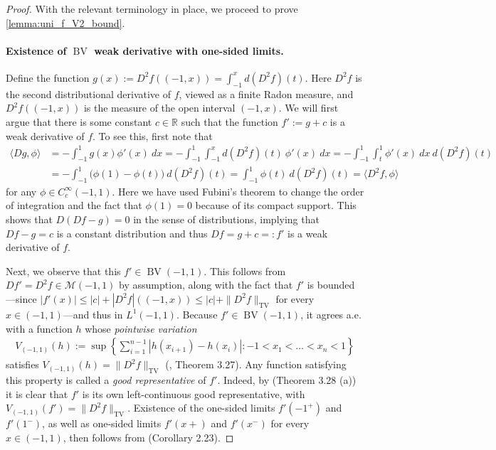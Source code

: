 \documentclass{article}
\DeclareMathOperator{\TV}{TV}
\DeclareMathOperator{\BV}{BV}
\def\cM{{\mathcal{M}}}
\newcommand{\R}{\mathbb{R}}
\begin{document}
\begin{appendices}
\begin{proof}
    With the relevant terminology in place, we proceed to prove \cref{lemma:uni_f_V2_bound}.
    \paragraph{Existence of $\BV$ weak derivative with one-sided limits.} Define the function $g(x) := D^2 f((-1,x))= \int_{-1}^x  d(D^2 f)(t)$. Here $D^2 f$ is the second distributional derivative of $f$, viewed as a finite Radon measure, and $D^2 f((-1,x))$ is the measure of the open interval $(-1,x)$. We will first argue that there is some constant $c \in \R$ such that the function $f' := g+c$ is a weak derivative of $f$. To see this, first note that 
    \begin{align}
        \langle Dg, \phi \rangle &= -\int_{-1}^1 g(x) \phi'(x) \ dx = -\int_{-1}^1 \int_{-1}^x  d(D^2 f)(t) \  \phi'(x) \ dx = - \int_{-1}^1 \int_{t}^1  \phi'(x)  \ dx \ d(D^2 f)(t) \\
        &= - \int_{-1}^1 \big(\phi(1) - \phi(t)\big) \ d (D^2 f)(t) = \int_{-1}^1 \phi(t) \ d(D^2 f)(t) = \langle D^2 f, \phi \rangle
    \end{align}
    for any $\phi \in C_c^\infty(-1,1)$. Here we have used Fubini's theorem to change the order of integration and the fact that $\phi(1)=0$ because of its compact support. This shows that $D(Df - g) = 0$ in the sense of distributions, implying that $Df-g = c$ is a constant distribution and thus $Df = g+c =: f'$ is a weak derivative of $f$.

    Next, we observe that this $f' \in \BV(-1,1)$. This follows from $Df' = D^2 f \in \cM(-1,1)$ by assumption, along with the fact that $f'$ is bounded---since $|f'(x)| \leq |c| + |D^2 f|((-1,x)) \leq |c| + \| D^2 f \|_{\TV}$ for every $x \in (-1,1)$---and thus in $L^1(-1,1)$. Because $f' \in \BV(-1,1)$, it agrees a.e. with a function $h$ whose \textit{pointwise variation}
    \begin{align} \label{eq:pointwise_variation}
        V_{(-1,1)} (h) := \sup \left\{ \sum_{i=1}^{n-1} |h(x_{i+1}) - h(x_i)|: -1 < x_1 < \dots < x_n < 1 \right\}
    \end{align}
    satisfies $V_{(-1,1)} (h) = \| D^2 f \|_{\TV}$ (\cite{ambrosio2000functions}, Theorem 3.27). Any function satisfying this property is called a \textit{good representative} of $f'$. Indeed, by \cite{ambrosio2000functions} (Theorem 3.28 (a)) it is clear that $f'$ is its own left-continuous good representative, with $V_{(-1,1)} (f') = \| D^2 f \|_{\TV}$. Existence of the one-sided limits $f'(-1^{+})$ and $f'(1^{-})$, as well as one-sided limits $f'(x+)$ and $f'(x^{-})$ for every $x \in (-1,1)$, then follows from \cite{leoni2017first} (Corollary 2.23).
    

\end{proof}
\end{appendices}
\end{document}
